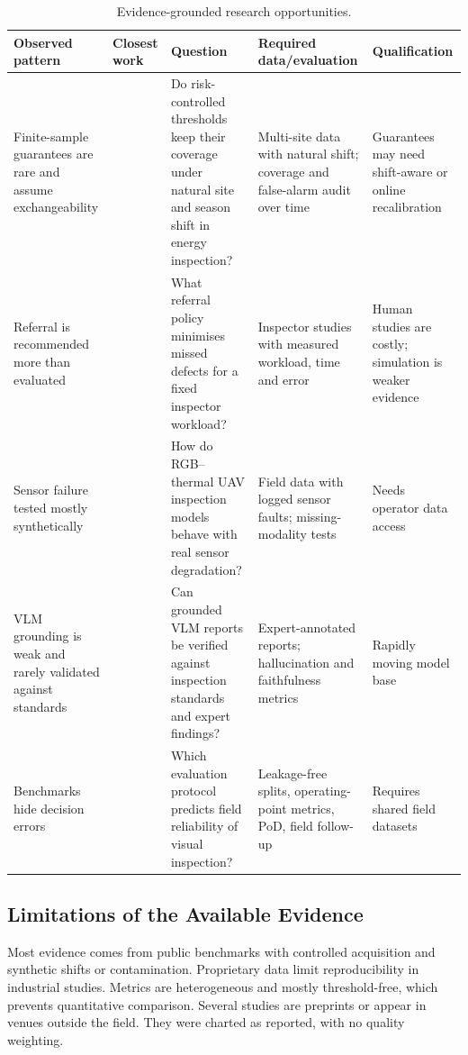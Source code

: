 \documentclass[journal]{IEEEtran}
\begin{document}
\begin{table}[t]
\caption{Evidence-grounded research opportunities.}
\label{tab:opportunities}
\centering\footnotesize
\begin{tabularx}{\textwidth}{YYYYY}
\toprule
Observed pattern & Closest work & Question & Required data/evaluation & Qualification \\
\midrule
Finite-sample guarantees are rare and assume exchangeability & \cite{estievenart2025risk,deng2026distribution,yang2026saferestore,estermann2026unsupervised} & Do risk-controlled thresholds keep their coverage under natural site and season shift in energy inspection? & Multi-site data with natural shift; coverage and false-alarm audit over time & Guarantees may need shift-aware or online recalibration \\
Referral is recommended more than evaluated & \cite{kinalioglu2026risk,alqahtani2026robust,senoner2024explainable,floreale2025automated} & What referral policy minimises missed defects for a fixed inspector workload? & Inspector studies with measured workload, time and error & Human studies are costly; simulation is weaker evidence \\
Sensor failure tested mostly synthetically & \cite{hoang2026supervised,deng2026maf,khandagale2026meta,hu2025fault} & How do RGB--thermal UAV inspection models behave with real sensor degradation? & Field data with logged sensor faults; missing-modality tests & Needs operator data access \\
VLM grounding is weak and rarely validated against standards & \cite{wallace2025inspectvlm,malikussaid2026hybrid,mistry2026from,zhong2026can} & Can grounded VLM reports be verified against inspection standards and expert findings? & Expert-annotated reports; hallucination and faithfulness metrics & Rapidly moving model base \\
Benchmarks hide decision errors & \cite{hecklerkram2026the,wu2026hdsi,plevris2025assessing,kompanets2026evaluation} & Which evaluation protocol predicts field reliability of visual inspection? & Leakage-free splits, operating-point metrics, PoD, field follow-up & Requires shared field datasets \\
\bottomrule
\end{tabularx}
\end{table}

\subsection{Limitations of the Available Evidence}
Most evidence comes from public benchmarks with controlled acquisition and synthetic shifts or contamination. Proprietary data limit reproducibility in industrial studies. Metrics are heterogeneous and mostly threshold-free, which prevents quantitative comparison. Several studies are preprints or appear in venues outside the field. They were charted as reported, with no quality weighting.
\end{document}
